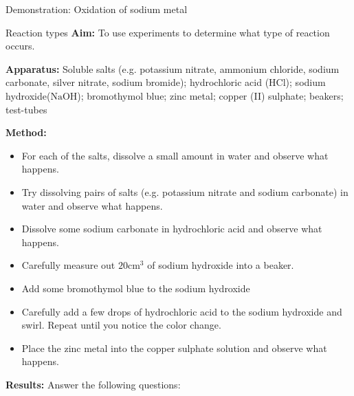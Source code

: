{{\begin{g_experiment}{Demonstration: Oxidation of sodium metal}
\end{g_experiment}
	\par
\label{m38719*eip-611}
            \begin{g_experiment}{Reaction types}
            \nopagebreak
            \label{m38719*eip-190}\noindent{}\textbf{Aim: }\newline
    To use experiments to determine what type of reaction occurs.
\par 
\label{m38719*eip-1901}\noindent{}\textbf{Apparatus: }\newline
    Soluble salts (e.g. potassium nitrate, ammonium chloride, sodium carbonate, silver nitrate, sodium bromide); hydrochloric acid ($\text{HCl}$); sodium hydroxide($\text{NaOH}$); bromothymol blue; zinc metal; copper (II) sulphate; beakers; test-tubes
\par 
\label{m38719*eip-1902}\noindent{}\textbf{Method: }\label{m38719*id6231}\begin{itemize}[noitemsep]
            \item For each of the salts, dissolve a small amount in water and observe what happens.\item Try dissolving pairs of salts (e.g. potassium nitrate and sodium carbonate) in water and observe what happens.\item Dissolve some sodium carbonate in hydrochloric acid and observe what happens.\item Carefully measure out $20{\text{cm}}^{3}$ of sodium hydroxide into a beaker. \item Add some bromothymol blue to the sodium hydroxide\item Carefully add a few drops of hydrochloric acid to the sodium hydroxide and swirl. Repeat until you notice the color change.\item Place the zinc metal into the copper sulphate solution and observe what happens.\end{itemize}
\par 
\label{m38719*eip-1903}\noindent{}\textbf{Results: }\newline
    Answer the following questions:
\label{m38719*id6144}\begin{itemize}[noitemsep]

\end{itemize}
\end{g_experiment}}}
